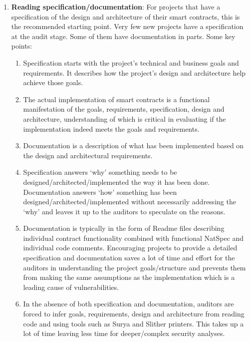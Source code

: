 \begin{enumerate}
\item\textbf{Reading specification/documentation}: For projects that have a specification of the design and architecture of their smart contracts, this is the recommended starting point. Very few new projects have a specification at the audit stage. Some of them have documentation in parts. Some key points:
	\begin{enumerate}
	\item Specification starts with the project’s technical and business goals and requirements. It describes how the project’s design and architecture help achieve those goals.
	\item The actual implementation of smart contracts is a functional manifestation of the goals, requirements, specification, design and architecture, understanding of which is critical in evaluating if the implementation indeed meets the goals and requirements.
	\item Documentation is a description of what has been implemented based on the design and architectural requirements.
	\item Specification answers ‘why’ something needs to be designed/architected/implemented the way it has been done. Documentation answers ‘how’ something has been designed/architected/implemented without necessarily addressing the ‘why’ and leaves it up to the auditors to speculate on the reasons.
	\item Documentation is typically in the form of Readme files describing individual contract functionality combined with functional NatSpec and individual code comments. Encouraging projects to provide a detailed specification and documentation saves a lot of time and effort for the auditors in understanding the project goals/structure and prevents them from making the same assumptions as the implementation which is a leading cause of vulnerabilities.
	\item In the absence of both specification and documentation, auditors are forced to infer goals, requirements, design and architecture from reading code and using tools such as Surya and Slither printers. This takes up a lot of time leaving less time for deeper/complex security analyses.
	\end{enumerate}


\end{enumerate}
